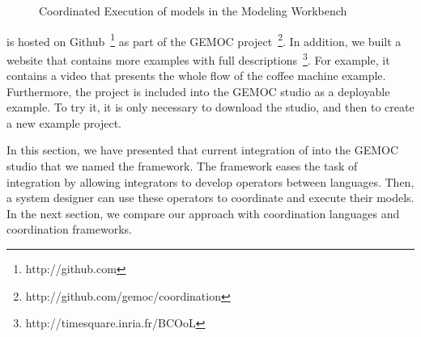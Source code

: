 \begin{figure}[h]
	\centering
	\caption[]{Coordinated Execution of models in the Modeling Workbench}
	\label{fig:subfigureExample1}
\end{figure}

\bcool is hosted on Github~\footnote{http://github.com} as part of the GEMOC project~\footnote{http://github.com/gemoc/coordination}. In addition, we built a website that contains more examples with full descriptions~\footnote{http://timesquare.inria.fr/BCOoL}. For example, it contains a video that presents the whole flow of the coffee machine example. Furthermore, the project is included into the GEMOC studio as a deployable example. To try it, it is only necessary to download the studio, and then to create a new example project. 

In this section, we have presented that current integration of \bcool into the GEMOC studio that we named the \bcool framework. The framework eases the task of integration by allowing integrators to develop operators between languages. Then, a system designer can use these operators to coordinate and execute their models. In the next section, we compare our approach with coordination languages and coordination frameworks.  

